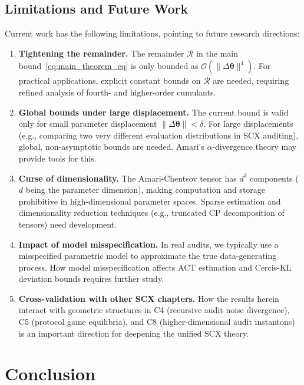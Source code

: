 \documentclass[12pt,a4paper]{article}
\theoremstyle{plain}
\theoremstyle{definition}
\theoremstyle{remark}
\newcommand{\SCX}{\textsf{SCX}}
\newcommand{\Cercis}{\textsf{Cercis}}
\begin{document}
\subsection{Limitations and Future Work}

Current work has the following limitations, pointing to future research directions:

\begin{enumerate}[label=(\arabic*), leftmargin=*]
    \item \textbf{Tightening the remainder.} The remainder $\mathcal{R}$ in the main bound~\eqref{eq:main_theorem_eq} is only bounded as $\mathcal{O}(\|\Delta\bm{\theta}\|^4)$. For practical applications, explicit constant bounds on $\mathcal{R}$ are needed, requiring refined analysis of fourth- and higher-order cumulants.
    \item \textbf{Global bounds under large displacement.} The current bound is valid only for small parameter displacement $\|\Delta\bm{\theta}\| < \delta$. For large displacements (e.g., comparing two very different evaluation distributions in \SCX{} auditing), global, non-asymptotic bounds are needed. Amari's $\alpha$-divergence theory may provide tools for this.
    \item \textbf{Curse of dimensionality.} The Amari-Chentsov tensor has $d^3$ components ($d$ being the parameter dimension), making computation and storage prohibitive in high-dimensional parameter spaces. Sparse estimation and dimensionality reduction techniques (e.g., truncated CP decomposition of tensors) need development.
    \item \textbf{Impact of model misspecification.} In real audits, we typically use a misspecified parametric model to approximate the true data-generating process. How model misspecification affects ACT estimation and \Cercis-KL deviation bounds requires further study.
    \item \textbf{Cross-validation with other \SCX{} chapters.} How the results herein interact with geometric structures in C4 (recursive audit noise divergence), C5 (protocol game equilibria), and C8 (higher-dimensional audit instantons) is an important direction for deepening the unified \SCX{} theory.
\end{enumerate}

\section{Conclusion}
\label{sec:conclusion}
\end{document}

